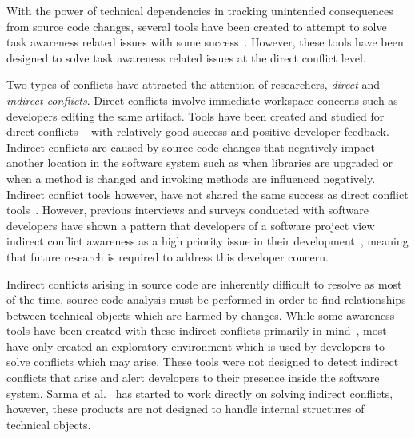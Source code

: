 With the power of technical dependencies in tracking unintended consequences from source code changes, several tools 
have been created to attempt to solve task awareness related issues with some 
success~\cite{Xiang:2008:ERT, Biehl:2007:FVD, Sarma:2009:TIV, Khurana:2009:PFC}. However, these tools have been designed 
to solve task awareness related issues at the direct conflict level. 

Two types of conflicts have attracted the attention of researchers, \textit{direct} and 
\textit{indirect conflicts}. Direct conflicts involve immediate workspace concerns such as developers editing the same
artifact. Tools have been created and studied for direct conflicts
~\cite{Xiang:2008:ERT, Biehl:2007:FVD, Sarma:2009:TIV, Khurana:2009:PFC} with relatively good success and 
positive developer feedback. Indirect conflicts are caused by source code changes that negatively impact another
location in the software system such as when libraries are upgraded or when a method is changed
and invoking methods are influenced negatively. Indirect conflict tools however, have
not shared the same success as direct conflict 
tools~\cite{Sarma:2007:TSA, Holmes:2010:CAR, Trainer:2005:BGT, Servant:2010:CPI, Borici:2012:CHA}. However,
previous interviews and surveys conducted with software developers have shown a pattern that developers 
of a software project view indirect conflict awareness  as a high priority issue in their 
development~\cite{Damian:2007:GSE, Halverson:2006:DTV, Begel:2010:CDE, Schroter:2012:TTF}, meaning that future research
is required to address this developer concern.

Indirect conflicts arising in source code are inherently difficult to resolve as most of the time, source code analysis must 
be performed in order to find relationships between technical objects which are harmed by changes. While some awareness 
tools have been created with these indirect conflicts primarily in mind~\cite{Begel:2010:CDE, Trainer:2005:BGT}, most have only 
created an exploratory environment which is used by developers to solve conflicts which may arise. These tools were not designed 
to detect indirect conflicts that arise and alert developers to their presence  inside the software system. 
Sarma et al.~\cite{Sarma:2007:TSA} has started to work directly on solving indirect conflicts, however, these products are not 
designed to handle internal structures of technical objects.

